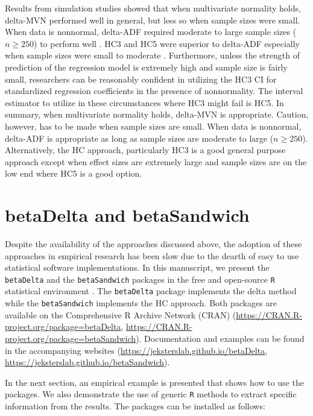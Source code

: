 \documentclass[man]{apa7}\usepackage[]{graphicx}\usepackage[]{xcolor}
\begin{document}
Results from simulation studies \parencite{Lib-Regression-Standardized-Coefficients-Delta-Yuan-2011, Lib-Regression-Standardized-Coefficients-Delta-Jones-2013a} showed that when multivariate normality holds, delta-MVN performed well in general, but less so when sample sizes were small. When data is nonnormal, delta-ADF required moderate to large sample sizes ($n \geq 250$) to perform well \parencite{Lib-Regression-Standardized-Coefficients-Delta-Jones-2015}. HC3 and HC5 were superior to delta-ADF especially when sample sizes were small to moderate \parencite{Lib-Regression-Standardized-Coefficients-HC-Dudgeon-2017}. Furthermore, unless the strength of prediction of the regression model is extremely high and sample size is fairly small, researchers can be reasonably confident in utilizing the HC3 CI for standardized regression coefficients in the presence of nonnormality. The interval estimator to utilize in these circumstances where HC3 might fail is HC5. In summary, when multivariate normality holds, delta-MVN is appropriate. Caution, however, has to be made when sample sizes are small. When data is nonnormal, delta-ADF is appropriate as long as sample sizes are moderate to large ($n \geq 250$). Alternatively, the HC approach, particularly HC3 is a good general purpose approach except when effect sizes are extremely large and sample sizes are on the low end where HC5 is a good option.

\section{betaDelta and betaSandwich}

Despite the availability of the approaches discussed above, the adoption of these approaches in empirical research has been slow due to the dearth of easy to use statistical software implementations. In this manuscript, we present the \texttt{betaDelta} and the \texttt{betaSandwich} packages in the free and open-source \texttt{R} statistical environment \parencite{Lib-R-Manual-2022}. The \texttt{betaDelta} package implements the delta method while the \texttt{betaSandwich} implements the HC approach. Both packages are available on the Comprehensive R Archive Network (CRAN) (\url{https://CRAN.R-project.org/package=betaDelta}, \url{https://CRAN.R-project.org/package=betaSandwich}). Documentation and examples can be found in the accompanying websites (\url{https://jeksterslab.github.io/betaDelta}, \url{https://jeksterslab.github.io/betaSandwich}).

In the next section, an empirical example is presented that shows how to use the packages. We also demonstrate the use of generic \texttt{R} methods to extract specific information from the results. The packages can be installed as follows:
\end{document}
